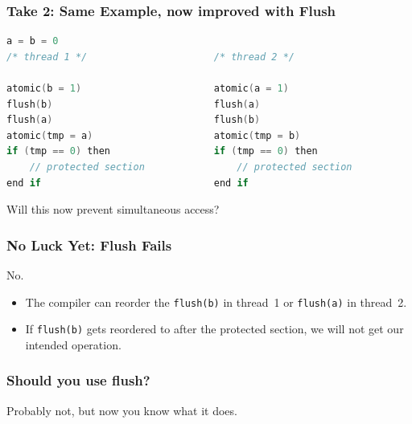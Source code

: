 \begin{frame}[fragile]
  \frametitle{Take 2: Same Example, now improved with Flush}

  \begin{lstlisting}[language=C,morekeywords={foreach,pragma,omp,parallel,single,nowait,task,untied,barrier,taskyield,mergeable,final,taskwait,critical}]
                    a = b = 0
/* thread 1 */                      /* thread 2 */

atomic(b = 1)                       atomic(a = 1)
flush(b)                            flush(a)
flush(a)                            flush(b)
atomic(tmp = a)                     atomic(tmp = b)
if (tmp == 0) then                  if (tmp == 0) then
    // protected section                // protected section
end if                              end if
  \end{lstlisting}

\Large
Will this now prevent simultaneous access?

\end{frame}

\begin{frame}[fragile]
  \frametitle{No Luck Yet: Flush Fails}

  

  \begin{center}
    \alert{\LARGE No.}
  \end{center}

  \begin{itemize}
    \item The compiler can reorder the {\tt flush(b)} in thread~1 or
      {\tt flush(a)} in thread~2.

    \item If {\tt flush(b)} gets reordered to after the protected
      section, we will not get our intended operation.
  \end{itemize}
  
\end{frame}

\begin{frame}[fragile]
  \frametitle{Should you use flush?}

  
  \Large
  Probably not, but now you know what it does.
  

\end{frame}


